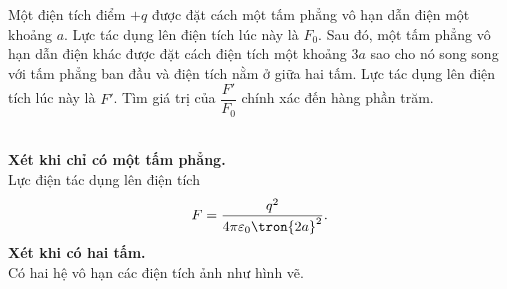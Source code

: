     
\begin{vd}
    Một điện tích điểm $+ q$ được đặt cách một tấm phẳng vô hạn dẫn điện một khoảng $a$. Lực tác dụng lên điện tích lúc này là $F_0$. Sau đó, một tấm phẳng vô hạn dẫn điện khác được đặt cách điện tích một khoảng $3a$ sao cho nó song song với tấm phẳng ban đầu và điện tích nằm ở giữa hai tấm. Lực tác dụng lên điện tích lúc này là $F'$. Tìm giá trị của $\displaystyle\dfrac{F'}{F_0}$ chính xác đến hàng phần trăm.
    \end{vd}
    \begin{loigiai}\\
    \textbf{Xét khi chỉ có một tấm phẳng.}\\
    Lực điện tác dụng lên điện tích
    $$F=\dfrac{q^2}{4\pi\varepsilon_0\tron{2a}^2}.$$
    \textbf{Xét khi có hai tấm.}\\ 
    Có hai hệ vô hạn các điện tích ảnh như hình vẽ.
    \begin{center}

\begin{tikzpicture}[x=0.75pt,y=0.75pt,yscale=-1,xscale=1]


\end{tikzpicture}
\end{center}
\end{loigiai}
